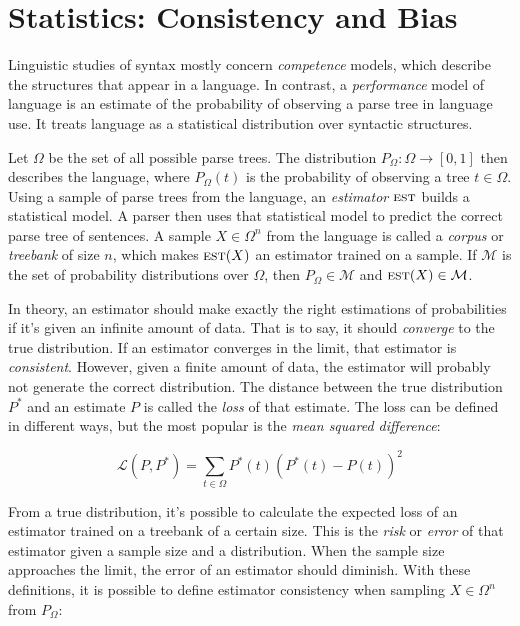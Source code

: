 \section{Statistics: Consistency and Bias}\label{sec:Statistics}


Linguistic studies of syntax mostly concern \emph{competence} models, which describe the structures that appear in a language. In contrast, a \emph{performance} model of language is an estimate of the probability of observing a parse tree in language use. It treats language as a statistical distribution over syntactic structures.

Let $\Omega$ be the set of all possible parse trees. The distribution $P_\Omega: \Omega\rightarrow [0,1]$ then describes the language, where $P_\Omega(t)$ is the probability of observing a tree $t \in \Omega$. Using a sample of parse trees from the language, an \emph{estimator} $\textsc{est}$ builds a statistical model. A parser then uses that statistical model to predict the correct parse tree of sentences.
A sample $X \in \Omega^n$ from the language is called a \emph{corpus} or \emph{treebank} of size $n$, which makes $\textsc{est}(X)$ an estimator trained on a sample. If $\mathcal{M}$ is the set of probability distributions over $\Omega$, then $P_\Omega \in \mathcal{M}$ and $\textsc{est}(X) \in \mathcal{M}$.

In theory, an estimator should make exactly the right estimations of probabilities if it's given an infinite amount of data. That is to say, it should \emph{converge} to the true distribution. If an estimator converges in the limit, that estimator is \emph{consistent}.
However, given a finite amount of data, the estimator will probably not generate the correct distribution. The distance between the true distribution $P^*$ and an estimate $P$ is called the \emph{loss} of that estimate. The loss can be defined in different ways, but the most popular is the \emph{mean squared difference}:

$$ \mathcal{L}(P, P^*) =  \sum_{t \in \Omega} P^*(t) (P^*(t)-P(t))^2$$

From a true distribution, it's possible to calculate the expected loss of an estimator trained on a treebank of a certain size. This is the \emph{risk} or \emph{error} of that estimator given a sample size and a distribution. 
When the sample size approaches the limit, the error of an estimator should diminish. With these definitions, it is possible to define estimator consistency when sampling $X \in \Omega^n$ from $P_\Omega$:

